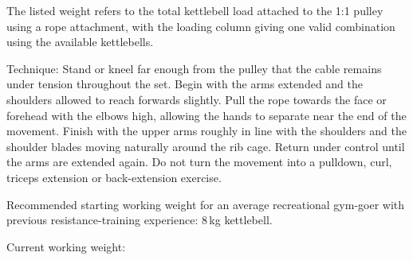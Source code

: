\documentclass[11pt,a4paper]{article}
\begin{document}
The listed weight refers to the total kettlebell load attached to the 1:1 pulley using a rope attachment, with the loading column giving one valid combination using the available kettlebells.

Technique: Stand or kneel far enough from the pulley that the cable remains under tension throughout the set. Begin with the arms extended and the shoulders allowed to reach forwards slightly. Pull the rope towards the face or forehead with the elbows high, allowing the hands to separate near the end of the movement. Finish with the upper arms roughly in line with the shoulders and the shoulder blades moving naturally around the rib cage. Return under control until the arms are extended again. Do not turn the movement into a pulldown, curl, triceps extension or back-extension exercise.

Recommended starting working weight for an average recreational gym-goer with previous resistance-training experience: 8\,kg kettlebell.

Current working weight:
\end{document}

